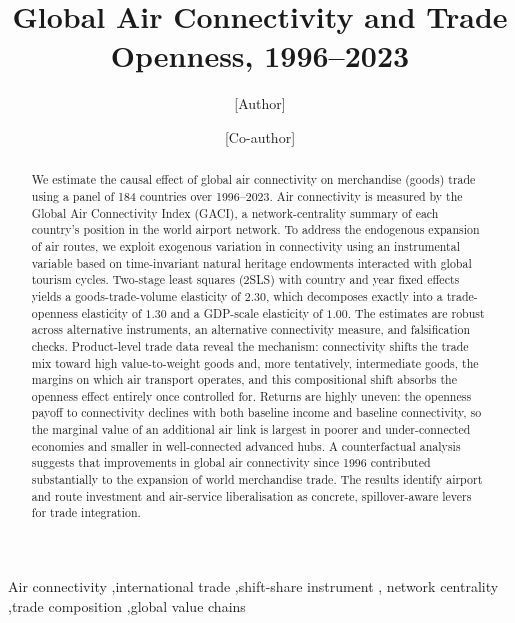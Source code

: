 \begin{frontmatter}

\title{Global Air Connectivity and Trade Openness, 1996--2023}

\author[a]{[Author]}
\ead{[email]}
\author[a]{[Co-author]}
\address[a]{[Affiliation]}

\begin{abstract}
We estimate the causal effect of global air connectivity on merchandise (goods) trade using a panel of 184 countries over 1996--2023. Air connectivity is measured by the Global Air Connectivity Index (GACI), a
network-centrality summary of each country's position in the world airport network. To address the endogenous expansion of air routes, we exploit exogenous variation in connectivity using an instrumental variable based on time-invariant natural heritage endowments interacted with global tourism cycles. Two-stage least squares (2SLS) with country and year fixed effects yields a goods-trade-volume elasticity of $2.30$, which decomposes exactly into a trade-openness elasticity of $1.30$ and a GDP-scale elasticity of $1.00$. The estimates are robust across alternative instruments, an alternative connectivity measure, and falsification checks. Product-level trade data reveal the mechanism: connectivity shifts the trade mix toward high value-to-weight goods and, more tentatively, intermediate goods, the margins on which air transport operates, and this compositional shift absorbs the openness effect entirely once controlled for. Returns are highly uneven: the openness payoff to connectivity declines with both baseline income and baseline connectivity, so the marginal value of an additional air link is largest in poorer and under-connected economies and smaller in well-connected advanced hubs. A counterfactual analysis suggests that improvements in global air connectivity since 1996 contributed substantially to the expansion of world merchandise trade. The results identify airport and route investment and air-service liberalisation as concrete, spillover-aware levers for trade integration.
\end{abstract}

\begin{keyword}
Air connectivity \sep international trade \sep shift-share instrument \sep
network centrality \sep trade composition \sep global value chains
\end{keyword}

\end{frontmatter}

